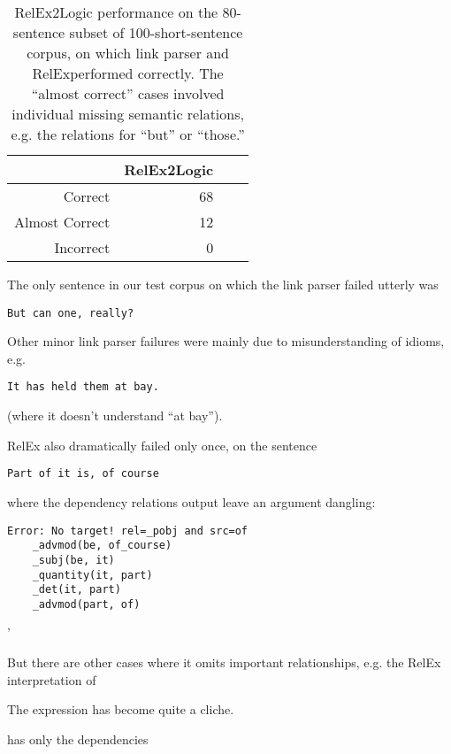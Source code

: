 \documentclass[11pt]{article}
\begin{document}
\begin{table}
\center
\begin{tabular}{|r|r|r||c|}
\hline
 & RelEx2Logic\\
\hline
Correct & 68    \\
Almost Correct & 12     \\
Incorrect & 0     \\

\hline
\end{tabular}
\caption{RelEx2Logic performance on the 80-sentence subset of 100-short-sentence corpus, on which link parser and RelExperformed correctly.  The ``almost correct'' cases involved individual missing semantic relations, e.g. the relations for ``but'' or ``those.''}
\label{table:settings}
\end{table}

\FloatBarrier

The only sentence in our test corpus on which the link parser failed utterly was

\begin{verbatim}
But can one, really?
\end{verbatim}

\noindent Other minor link parser failures were mainly due to misunderstanding of idioms, e.g.

 \begin{verbatim}
It has held them at bay.
 \end{verbatim}

\noindent (where it doesn't understand ``at bay'').

RelEx also dramatically failed only once, on the sentence 

 \begin{verbatim}
Part of it is, of course
 \end{verbatim}
 
 \noindent where the dependency relations output leave an argument dangling:
 

 \begin{verbatim}
Error: No target! rel=_pobj and src=of
    _advmod(be, of_course)
    _subj(be, it)
    _quantity(it, part)
    _det(it, part)
    _advmod(part, of)
 \end{verbatim}'
 
\noindent  But there are other cases where it omits important relationships, e.g. the RelEx interpretation of


The expression has become quite a cliche.

has only the dependencies
\end{document}
